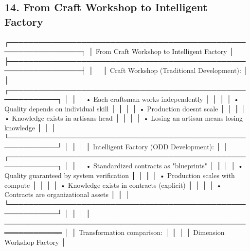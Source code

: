 \documentclass[
]{article}
\newenvironment{Shaded}{}{}
\newcommand{\NormalTok}[1]{#1}
\begin{document}
\hypertarget{14-from-craft-workshop-to-intelligent-factory}{%
\subsection{14. From Craft Workshop to Intelligent
Factory}\label{14-from-craft-workshop-to-intelligent-factory}}

\begin{Shaded}
\begin{Highlighting}[]
\NormalTok{┌─────────────────────────────────────────────────────────────────┐}
\NormalTok{│          From Craft Workshop to Intelligent Factory              │}
\NormalTok{├─────────────────────────────────────────────────────────────────┤}
\NormalTok{│                                                                  │}
\NormalTok{│  Craft Workshop (Traditional Development):                      │}
\NormalTok{│  ┌────────────────────────────────────────────────────────────┐ │}
\NormalTok{│  │  • Each craftsman works independently                      │ │}
\NormalTok{│  │  • Quality depends on individual skill                     │ │}
\NormalTok{│  │  • Production doesn\textquotesingle{}t scale                                │ │}
\NormalTok{│  │  • Knowledge exists in artisan\textquotesingle{}s head                      │ │}
\NormalTok{│  │  • Losing an artisan means losing knowledge                │ │}
\NormalTok{│  └────────────────────────────────────────────────────────────┘ │}
\NormalTok{│                                                                  │}
\NormalTok{│  Intelligent Factory (ODD Development):                         │}
\NormalTok{│  ┌────────────────────────────────────────────────────────────┐ │}
\NormalTok{│  │  • Standardized contracts as "blueprints"                  │ │}
\NormalTok{│  │  • Quality guaranteed by system verification               │ │}
\NormalTok{│  │  • Production scales with compute                          │ │}
\NormalTok{│  │  • Knowledge exists in contracts (explicit)                │ │}
\NormalTok{│  │  • Contracts are organizational assets                     │ │}
\NormalTok{│  └────────────────────────────────────────────────────────────┘ │}
\NormalTok{│                                                                  │}
\NormalTok{│  ══════════════════════════════════════════════════════════════  │}
\NormalTok{│  Transformation comparison:                                     │}
\NormalTok{│                                                                  │}
\NormalTok{│  Dimension        Workshop          Factory                     │}

\end{Highlighting}
\end{Shaded}
\end{document}
